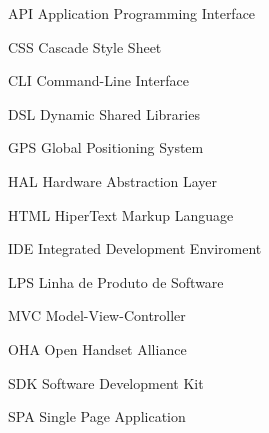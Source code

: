 \begin{siglas}
  
  \item[API] Application Programming Interface
  \item[CSS] Cascade Style Sheet
  \item[CLI] Command-Line Interface
  \item[DSL] Dynamic Shared Libraries
  \item[GPS] Global Positioning System
  \item[HAL] Hardware Abstraction Layer
  \item[HTML] HiperText Markup Language
  \item[IDE] Integrated Development Enviroment
  \item[LPS] Linha de Produto de Software
  \item[MVC] Model-View-Controller
  \item[OHA] Open Handset Alliance
  \item[SDK] Software Development Kit
  \item[SPA] Single Page Application
    
\end{siglas}
